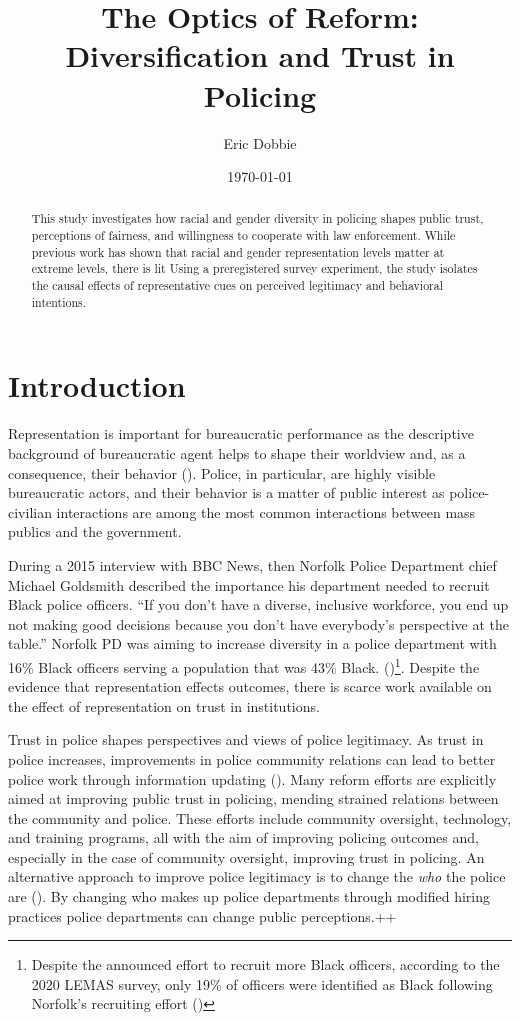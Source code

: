 \documentclass[12pt]{article}
\title{The Optics of Reform: Diversification and Trust in Policing}
\author{Eric Dobbie}
\date{\today}
\begin{document}
\maketitle
\doublespacing

\begin{abstract}
This study investigates how racial and gender diversity in policing shapes public trust, perceptions of fairness, and willingness to cooperate with law enforcement. While previous work has shown that racial and gender representation levels matter at extreme levels, there is lit Using a preregistered survey experiment, the study isolates the causal effects of representative cues on perceived legitimacy and behavioral intentions.
\end{abstract}

\newpage
\section{Introduction}

Representation is important for bureaucratic performance as the descriptive background of bureaucratic agent helps to shape their worldview and, as a consequence, their behavior (\cite{kennedy2017race, shoub2021female, ba2021role}). Police, in particular, are highly visible bureaucratic actors, and their behavior is a matter of public interest as police-civilian interactions are among the most common interactions between mass publics and the government. 

During a 2015 interview with BBC News, then Norfolk Police Department chief Michael Goldsmith described the importance his department needed to recruit Black police officers. ``If you don't have a diverse, inclusive workforce, you end up not making good decisions because you don't have everybody's perspective at the table.'' Norfolk PD was aiming to increase diversity in a police department with 16\% Black officers serving a population that was 43\% Black. (\cite{NorfolkPD_BBCRecruitment_2015})\footnote{Despite the announced effort to recruit more Black officers, according to the 2020 LEMAS survey, only 19\% of officers were identified as Black following Norfolk's recruiting effort  (\cite{LEMAS2020})}. Despite the evidence that representation effects outcomes, there is scarce work available on the effect of representation on trust in institutions.

Trust in police shapes perspectives and views of police legitimacy. As trust in police increases, improvements in police community relations can lead to better police work through information updating (\cite{mccall_resident_2019}). Many reform efforts are explicitly aimed at improving public trust in policing, mending strained relations between the community and police. These efforts include community oversight, technology, and training programs, all with the aim of improving policing outcomes and, especially in the case of community oversight, improving trust in policing. An alternative approach to improve police legitimacy is to change the \textit{who} the police are (\cite{meier2006gender, nicholson2017will}). By changing who makes up police departments through modified hiring practices police departments can change public perceptions.++
\end{document}
